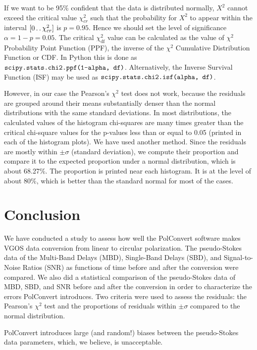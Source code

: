 \documentclass[letterpaper,twoside,12pt]{article}
\newcommand{\twodots}{\mathinner {\ldotp \ldotp}}
\begin{document}
If we want to be 95\% confident that the data is distributed normally, $X^2$ cannot exceed the critical value $\chi^2_{cr}$ such that the probability for $X^2$ to appear within the interval $[0 \twodots \chi^2_{cr}]$ is $p=0.95$. Hence we should set the level of significance $\alpha = 1 - p = 0.05$.  The critical $\chi^2_\mathrm{df}$ value can be calculated as the value of $\chi^2$ Probability Point Function (PPF), the inverse of the $\chi^2$ Cumulative Distribution Function or CDF. In Python this is done as $\verb@scipy.stats.chi2.ppf(1-alpha, df)@$. Alternatively, the Inverse Survival Function (ISF) may be used as $\verb@scipy.stats.chi2.isf(alpha, df)@$.

However, in our case the Pearson's $\chi^2$ test does not work, because the residuals are grouped around their means substantially denser than the normal distributions with the same standard deviations. In most distributions, the calculated values of the histogram chi-squares are many times greater than the critical chi-square values for the p-values less than or equal to 0.05 (printed in each of the histogram plots).
We have used another method. Since the residuals are mostly within $\pm \sigma$ (standard deviation), we  compute their proportion and compare it to the expected proportion under a normal distribution, which is about 68.27\%. The proportion is printed near each histogram. It is at the level of about 80\%, which is better than the standard normal for most of the cases.


\section{Conclusion}

We have conducted a study to assess how well the PolConvert software makes VGOS data conversion from linear to circular polarization. The pseudo-Stokes data of the Multi-Band Delays (MBD), Single-Band Delays (SBD), and Signal-to-Noise Ratios (SNR) as functions of time before and after the conversion were compared. We also did a statistical comparison of the pseudo-Stokes data of MBD, SBD, and SNR before and after the conversion in order to characterize the errors PolConvert introduces. Two criteria were used to assess the residuals: the Pearson's $\chi^2$ test and the proportions of residuals within $\pm\sigma$ compared to the normal distribution. 

PolConvert introduces large (and random!) biases between the pseudo-Stokes data parameters, which, we believe, is unacceptable. 
\end{document}
